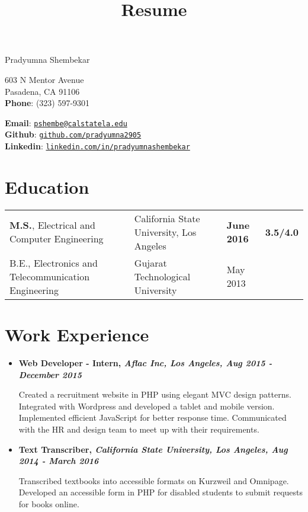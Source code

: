 \documentclass[10pt]{article}%
\title{Resume}
\def\name{Pradyumna Shembekar}
\begin{document}
{\huge \name}


\bigskip

\begin{minipage}[t]{0.495\textwidth}

  603 N Mentor Avenue\\
  Pasadena, CA 91106\\ \textbf{Phone}: (323) 597-9301
\end{minipage}
\begin{minipage}[t]{0.495\textwidth}
  \textbf{Email}: \href{mailto:pshembe@calstatela.edu}{\tt{pshembe@calstatela.edu}} \\ \textbf{Github}: \href{https://github.com/pradyumna2905}{\tt{github.com/pradyumna2905}} \\ \textbf{Linkedin}: \href{https://www.linkedin.com/in/pradyumnashembekar}{\tt{linkedin.com/in/pradyumnashembekar}}
\end{minipage}

\section*{Education}

\begin{tabular}{llll}
  \textbf{M.S.}, Electrical and Computer Engineering & California State University, Los Angeles & \textbf{June 2016} & \textbf{3.5/4.0} \\
  B.E., Electronics and Telecommunication Engineering & Gujarat Technological University & May 2013 \\
\end{tabular}

\section*{Work Experience}

\begin{itemize} \setlength{\parskip}{0.5pt} 
    
    \item \textbf{Web Developer - Intern, \textit{Aflac Inc, Los Angeles, Aug 2015 - December 2015}}
    
		Created a recruitment website in PHP using elegant MVC design patterns. Integrated with Wordpress and developed a tablet and mobile version. Implemented efficient JavaScript for better response time. Communicated with the HR and design team to meet up with their requirements.
    
    \item \textbf{Text Transcriber, \textit{California State University, Los Angeles, Aug 2014 - March 2016}}
        
        Transcribed textbooks into accessible formats on Kurzweil and Omnipage. Developed an accessible form in PHP for disabled students to submit requests for books online.
        
\end{itemize}
\end{document}
